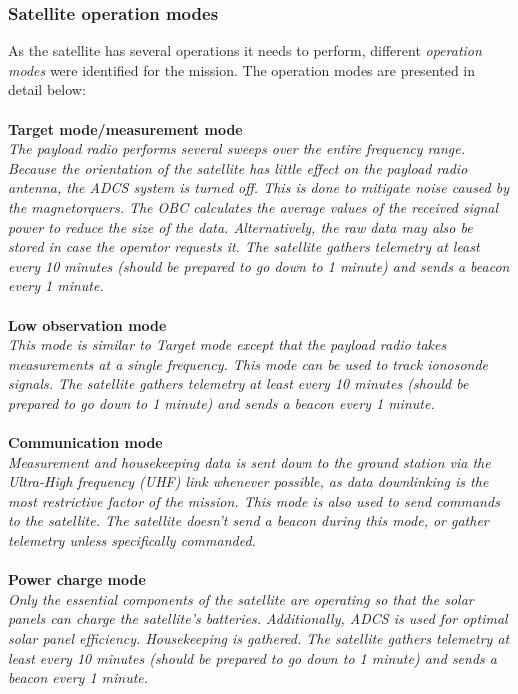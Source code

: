 \documentclass[english,12pt,a4paper,pdftex,elec,utf8]{aaltothesis}
\begin{document}
\subsubsection{Satellite operation modes}
As the satellite has several operations it needs to perform, different \textit{operation modes} were identified for the mission.
The operation modes are presented in detail below:\\
\\
\textbf{Target mode/measurement mode}\\
\textit{The payload radio performs several sweeps over the entire frequency range. Because the orientation of the satellite has little effect on the payload radio antenna, the ADCS system is turned off. This is done to mitigate noise caused by the magnetorquers. The OBC calculates   the average values of the received signal power to reduce the size of the data. Alternatively, the raw data may also be stored in case the operator requests it. The satellite gathers telemetry at least every 10 minutes (should be prepared to go down to 1 minute) and sends a beacon every 1 minute.}
\\
\\
\textbf{Low observation mode}\\
\textit{This mode is similar to Target mode except that the payload radio takes measurements at a single frequency. This mode can be used to track ionosonde signals. The satellite gathers telemetry at least every 10 minutes (should be prepared to go down to 1 minute) and sends a beacon every 1 minute.}
\\
\\
\textbf{Communication mode}\\
\textit{Measurement and housekeeping data is sent down to the ground station via the Ultra-High frequency (UHF) link whenever possible, as data downlinking is the most restrictive factor of the mission. This mode is also used to send commands to the satellite. The satellite doesn't send a beacon during this mode, or gather telemetry unless specifically commanded.}
\\
\\
\textbf{Power charge mode}\\
\textit{Only the essential components of the satellite are operating so that the solar panels can charge the satellite's batteries. Additionally, ADCS is used for optimal solar panel efficiency. Housekeeping is gathered. The satellite gathers telemetry at least every 10 minutes (should be prepared to go down to 1 minute) and sends a beacon every 1 minute.}
\end{document}
